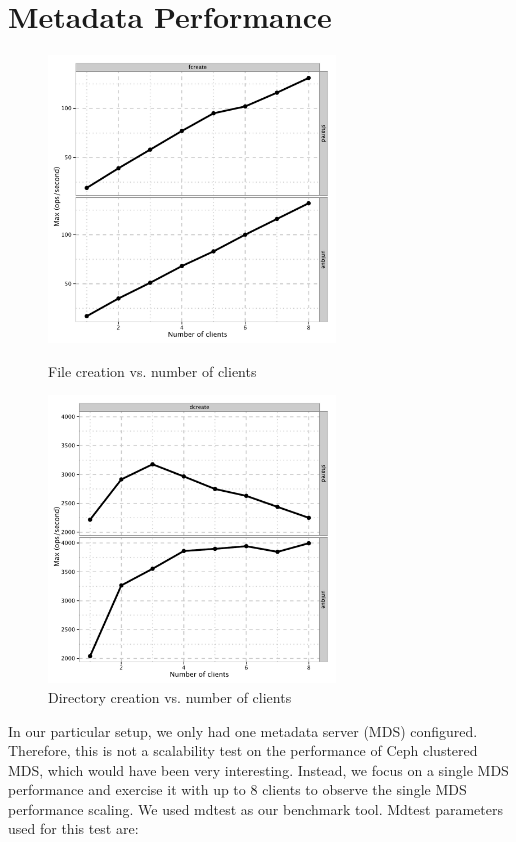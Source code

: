\documentclass{article}
\begin{document}
\section{Metadata Performance}

\begin{figure}[htb]
\centering
\begin{minipage}[t]{0.5\linewidth}
\centering
\includegraphics[width=3in]{data/mdtest-fcreate}
\caption{File creation vs.  number of clients}
\label{fig:mdtest-fcreate}
\end{minipage}%
\begin{minipage}[t]{0.5\linewidth}
\centering
\includegraphics[width=3in]{data/mdtest-dcreate}
\caption{Directory creation vs. number of clients}
\label{fig:mdtest-dcreate}
\end{minipage}%
\end{figure}


In our particular setup, we only had one metadata server (MDS) configured.
Therefore, this is not a scalability test on the performance of Ceph clustered
MDS, which would have been very interesting.  Instead, we focus on a single MDS
performance and exercise it with up to 8 clients to observe the single MDS
performance scaling. We used mdtest as our benchmark tool. Mdtest parameters
used for this test are:
\end{document}
